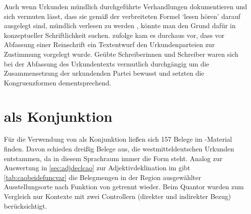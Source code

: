 Auch wenn Urkunden mündlich durchgeführte Verhandlungen dokumentieren und sich
vermuten lässt, dass sie gemäß der verbreiteten Formel 
`lesen hören' darauf ausgelegt sind, mündlich verlesen zu werden
\autocites[595]{schmidtwiegand1998b}[31]{schulze2011}, könnte man den Grund
dafür in konzeptueller Schriftlichkeit suchen. \citet[588--589]{frenz1998b}
zufolge kam es durchaus vor, dass vor Abfassung einer Reinschrift ein
Textentwurf den Urkundenparteien zur Zustimmung vorgelegt wurde. Geübte
Schreiberinnen und Schreiber waren sich bei der Abfassung des Urkundentexts
vermutlich durchgängig um die Zusammensetzung der urkundenden Partei bewusst
und setzten die Kongruenzformen dementsprechend.



\section{ als Konjunktion}
\label{sec:caokonjunktion}

Für die Verwendung von  als Konjunktion ließen sich 157 Belege im
\CAO{}-Material finden. Davon schieden dreißig Belege aus, die
westmitteldeutschen Urkunden entstammen, da in diesem Sprachraum immer die Form
 steht. Analog zur Auswertung in \cref{sec:adjdeclcao} zur
Adjektivdeklination im \CAO{} gibt \cref{tab:caobeidefuncvar} die
Belegmengen in der Region ausgewählter Ausstellungs\-orte nach Funktion von
 getrennt wieder. Beim Quantor wurden zum Vergleich nur Kontexte
mit zwei Controllern (direkter und indirekter Bezug) berücksichtigt.

